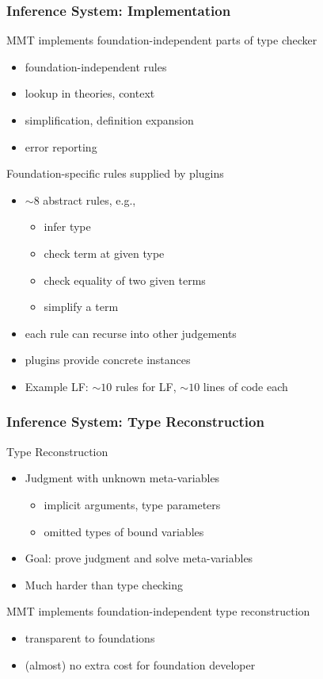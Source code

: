 \documentclass{beamer}
\begin{document}
\begin{frame}\frametitle{Inference System: Implementation}
MMT implements foundation-independent parts of type checker
 \begin{itemize}
   \item foundation-independent rules
   \item lookup in theories, context
   \item simplification, definition expansion
   \item error reporting
\end{itemize}

Foundation-specific rules supplied by plugins
 \begin{itemize}
   \item $\sim 8$ abstract rules, e.g.,
    \begin{itemize}
      \item infer type
      \item check term at given type
      \item check equality of two given terms
      \item simplify a term
    \end{itemize}
   \item each rule can recurse into other judgements
   \item plugins provide concrete instances
   \item Example LF: $\sim 10$ rules for LF, $\sim 10$ lines of code each
 \end{itemize}
\end{frame}

\begin{frame}\frametitle{Inference System: Type Reconstruction}
Type Reconstruction
\begin{itemize}
 \item Judgment with unknown meta-variables
   \begin{itemize}
     \item implicit arguments, type parameters
     \item omitted types of bound variables
   \end{itemize}
 \item Goal: prove judgment and solve meta-variables
 \item Much harder than type checking
\end{itemize}
\bigskip

MMT implements foundation-independent type reconstruction
\begin{itemize}
 \item transparent to foundations
 \item (almost) no extra cost for foundation developer
\end{itemize}
\end{frame}
\end{document}
